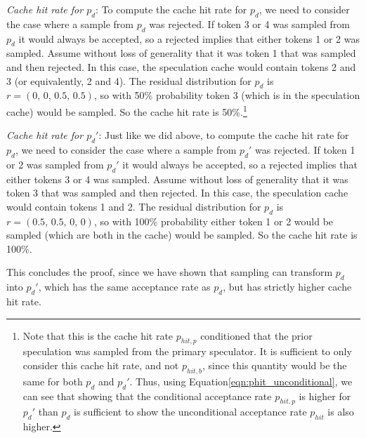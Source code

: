 \textit{Cache hit rate for $p_d$}:
To compute the cache hit rate for $p_d$, we need to consider the case where a sample from $p_d$ was rejected.
If token 3 or 4 was sampled from $p_d$ it would always be accepted, so a rejected implies that either tokens 1 or 2 was sampled.
Assume without loss of generality that it was token 1 that was sampled and then rejected.
In this case, the speculation cache would contain tokens 2 and 3 (or equivalently, 2 and 4).
The residual distribution for $p_d$ is $r = (0,\, 0,\, 0.5,\, 0.5)$, so with 50\% probability token 3 (which is in the speculation cache) would be sampled.
So the cache hit rate is 50\%.\footnote{Note that this is the cache hit rate $p_{hit,p}$ conditioned that the prior speculation was sampled from the primary speculator.
It is sufficient to only consider this cache hit rate, and not $p_{hit,b}$, since this quantity would be the same for both $p_d$ and $p_d'$.
Thus, using Equation\ref{eqn:phit_unconditional}, we can see that showing that the conditional acceptance rate $p_{hit,p}$ is higher for $p_d'$ than $p_d$ is sufficient to show the unconditional acceptance rate $p_{hit}$ is also higher.
}

\textit{Cache hit rate for $p_d'$}:
Just like we did above, to compute the cache hit rate for $p_d$, we need to consider the case where a sample from $p_d'$ was rejected.
If token 1 or 2 was sampled from $p_d'$ it would always be accepted, so a rejected implies that either tokens 3 or 4 was sampled.
Assume without loss of generality that it was token 3 that was sampled and then rejected.
In this case, the speculation cache would contain tokens 1 and 2.
The residual distribution for $p_d$ is $r = (0.5,\, 0.5,\, 0,\, 0)$, so with 100\% probability either token 1 or 2 would be sampled (which are both in the cache) would be sampled.
So the cache hit rate is 100\%.

This concludes the proof, since we have shown that \Sys sampling can transform $p_d$ into $p_d'$, which has the same acceptance rate as $p_d$, but has strictly higher cache hit rate.



